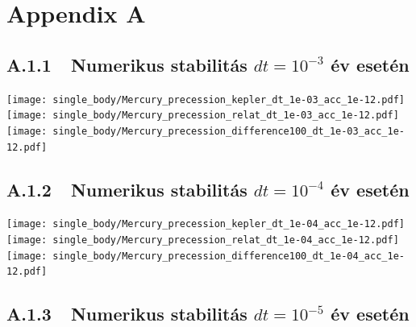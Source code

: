 \section*{Appendix A}

\subsection*{A.1.1\ \ Numerikus stabilitás $dt = 10^{-3}$ év esetén}

{\centering\texttt{[image: single\_body/Mercury\_precession\_kepler\_dt\_1e-03\_acc\_1e-12.pdf]}}
\label{fig:1}
\hfill \break \break
{\centering\texttt{[image: single\_body/Mercury\_precession\_relat\_dt\_1e-03\_acc\_1e-12.pdf]}}
\label{fig:2}
\hfill \break \break
{\centering\texttt{[image: single\_body/Mercury\_precession\_difference100\_dt\_1e-03\_acc\_1e-12.pdf]}}
\label{fig:3}

\newpage

\subsection*{A.1.2\ \ Numerikus stabilitás $dt = 10^{-4}$ év esetén}

{\centering\texttt{[image: single\_body/Mercury\_precession\_kepler\_dt\_1e-04\_acc\_1e-12.pdf]}}
\label{fig:4}
\hfill \break \break
{\centering\texttt{[image: single\_body/Mercury\_precession\_relat\_dt\_1e-04\_acc\_1e-12.pdf]}}
\label{fig:5}
\hfill \break \break
{\centering\texttt{[image: single\_body/Mercury\_precession\_difference100\_dt\_1e-04\_acc\_1e-12.pdf]}}
\label{fig:6}

\newpage

\subsection*{A.1.3\ \ Numerikus stabilitás $dt = 10^{-5}$ év esetén}

